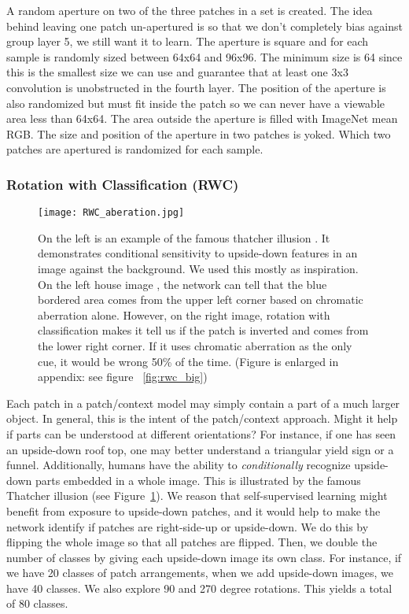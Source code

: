 \documentclass[10pt,twocolumn,letterpaper]{article}
\begin{document}
A random aperture on two of the three patches in a set is created. The idea behind leaving one patch un-apertured is so that we don't completely bias against group layer 5, we still want it to learn. The aperture is square and for each sample is randomly sized between 64x64 and 96x96. The minimum size is 64 since this is the smallest size we can use and guarantee that at least one 3x3 convolution is unobstructed in the fourth layer. The position of the aperture is also randomized but must fit inside the patch so we can never have a viewable area less than 64x64.  The area outside the aperture is filled with ImageNet mean RGB. The size and position of the aperture in two patches is yoked. Which two patches are apertured is randomized for each sample. 

\subsubsection{Rotation with Classification (RWC)}

\begin{figure}
\centering
\texttt{[image: RWC\_aberation.jpg]}
\caption{On the left is an example of the famous thatcher illusion \cite{Thompson80,MTeffect06}. It demonstrates conditional sensitivity to upside-down features in an image against the background. We used this mostly as inspiration. On the left house image \cite{ChromaHouse}, the network can tell that the blue bordered area comes from the upper left corner based on chromatic aberration alone. However, on the right image, rotation with classification makes it tell us if the patch is inverted and comes from the lower right corner. If it uses chromatic aberration as the only cue, it would be wrong 50\% of the time. (Figure is enlarged in appendix: see figure ~\ref{fig:rwc_big})}
\label{fig:rwc}
\end{figure}
Each patch in a patch/context model may simply contain a part of a much larger object. In general, this is the intent of the patch/context approach. Might it help if parts can be understood at different orientations? For instance, if one has seen an upside-down roof top, one may better understand a triangular yield sign or a funnel. Additionally, humans have the ability to \emph{conditionally} recognize upside-down parts embedded in a whole image. This is illustrated by the famous Thatcher illusion \cite{Thompson80} (see Figure~\ref{fig:rwc}). We reason that self-supervised learning might benefit from exposure to upside-down patches, and it would help to make the network identify if patches are right-side-up or upside-down. We do this by flipping the whole image so that all patches are flipped. Then, we double the number of classes by giving each upside-down image its own class. For instance, if we have 20 classes of patch arrangements, when we add upside-down images, we have 40 classes. We also explore 90 and 270 degree rotations. This yields a total of 80 classes.
\end{document}
